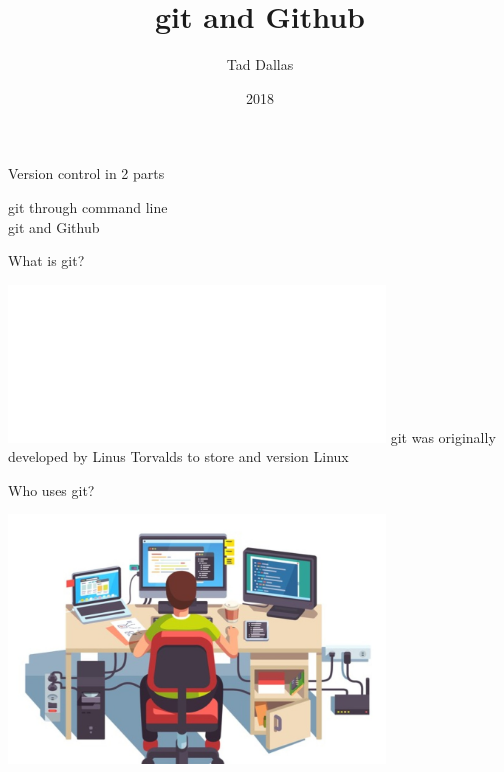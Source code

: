 \documentclass[12pt]{beamer}
\title{\Large git and Github}
\author{Tad Dallas}
\date{2018}
\begin{document}
\maketitle



\begin{frame}

	\begin{flushright}
		{\Large \textcolor{boss2}{Version control in 2 parts}}
	\end{flushright}

	\Huge	
	\textcolor{boss3}{git through command line} \\
	\bigskip
	\bigskip
	\textcolor{boss3}{git and Github} \\

\end{frame}







\begin{frame}

	\begin{flushright}
		{\Large \textcolor{boss2}{What is git?}}
	\end{flushright}
  \includegraphics[width=0.75\textwidth]{figs/Git-Logo-White.png}
	\textcolor{boss3}{git was originally developed by Linus Torvalds to store and version Linux}

\end{frame}






\begin{frame}

	\begin{flushright}
		\Large \textcolor{boss2}{Who uses git?} 
	\end{flushright}
	
	\begin{center}
	  \includegraphics[width=0.75\textwidth]{figs/stereotype.jpg}
	\end{center}

\end{frame}
\end{document}
